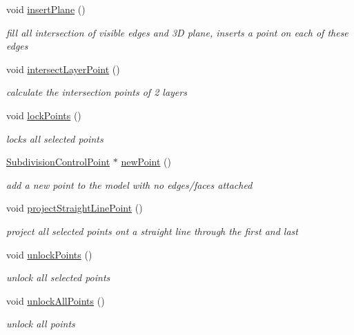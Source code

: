 \begin{DoxyCompactItemize}
void \hyperlink{classShipCAD_1_1Controller_aed43429330b5062ddb98372406a02d2d}{insert\-Plane} ()
\begin{DoxyCompactList}\small\item\em fill all intersection of visible edges and 3\-D plane, inserts a point on each of these edges \end{DoxyCompactList}\item 
void \hyperlink{classShipCAD_1_1Controller_a2a4079dc0201ed5e22776fbe942143f2}{intersect\-Layer\-Point} ()
\begin{DoxyCompactList}\small\item\em calculate the intersection points of 2 layers \end{DoxyCompactList}\item 
void \hyperlink{classShipCAD_1_1Controller_ad447a70b9f88ca1b9a81492fc3b86e2b}{lock\-Points} ()
\begin{DoxyCompactList}\small\item\em locks all selected points \end{DoxyCompactList}\item 
\hyperlink{classShipCAD_1_1SubdivisionControlPoint}{Subdivision\-Control\-Point} $\ast$ \hyperlink{classShipCAD_1_1Controller_ae4a1962572812591a48c25703bc70027}{new\-Point} ()
\begin{DoxyCompactList}\small\item\em add a new point to the model with no edges/faces attached \end{DoxyCompactList}\item 
void \hyperlink{classShipCAD_1_1Controller_aaf39d00fed33f46dea7d5f6a8b5839f1}{project\-Straight\-Line\-Point} ()
\begin{DoxyCompactList}\small\item\em project all selected points ont a straight line through the first and last \end{DoxyCompactList}\item 
void \hyperlink{classShipCAD_1_1Controller_a7038d511c9398f34ec9df3d0a1311b14}{unlock\-Points} ()
\begin{DoxyCompactList}\small\item\em unlock all selected points \end{DoxyCompactList}\item 
void \hyperlink{classShipCAD_1_1Controller_af983f99c449cd485a6362768a64d3c1e}{unlock\-All\-Points} ()
\begin{DoxyCompactList}\small\item\em unlock all points \end{DoxyCompactList}\item 

\end{DoxyCompactItemize}
